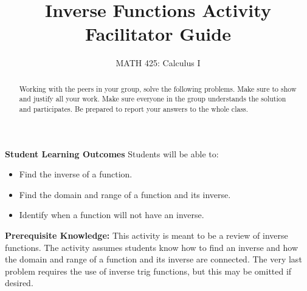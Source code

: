 \documentclass{ximera}
\title{Inverse Functions Activity Facilitator Guide}
\author{MATH 425: Calculus I}
\begin{document}
\begin{abstract}
    Working with the peers in your group, solve the following problems. Make sure to show and justify all your work. Make sure everyone in the group understands the solution and participates. Be prepared to report your answers to the whole class. 
\end{abstract}
\maketitle

\textbf{Student Learning Outcomes}
Students will be able to:
\begin{itemize}
    \item Find the inverse of a function.
    \item Find the domain and range of a function and its inverse.
    \item Identify when a function will not have an inverse.
\end{itemize}

\textbf{Prerequisite Knowledge:} This activity is meant to be a review of inverse functions.  The activity assumes students know how to find an inverse and how the domain and range of a function and its inverse are connected.  The very last problem requires the use of inverse trig functions, but this may be omitted if desired.
\end{document}
